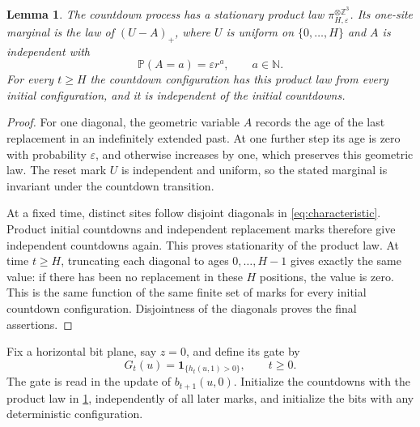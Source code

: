 \documentclass[11pt]{article}
\theoremstyle{plain}
\newtheorem{lemma}[theorem]{Lemma}
\theoremstyle{definition}
\theoremstyle{remark}
\newcommand{\Z}{\mathbb Z}
\newcommand{\N}{\mathbb N}
\newcommand{\Prob}{\mathbb P}
\newcommand{\eps}{\varepsilon}
\newcommand{\ind}{\mathbf 1}
\begin{document}
\begin{lemma}\label{lem:stationaryclock}
The countdown process has a stationary product law $\pi_{H,\eps}^{\otimes\Z^3}$. Its one-site marginal is the law of $(U-A)_+$, where $U$ is uniform on $\{0,\ldots,H\}$ and $A$ is independent with
\[
 \Prob(A=a)=\eps r^a,\qquad a\in\N.
\]
For every $t\geq H$ the countdown configuration has this product law from every initial configuration, and it is independent of the initial countdowns.
\end{lemma}
\begin{proof}
For one diagonal, the geometric variable $A$ records the age of the last replacement in an indefinitely extended past. At one further step its age is zero with probability $\eps$, and otherwise increases by one, which preserves this geometric law. The reset mark $U$ is independent and uniform, so the stated marginal is invariant under the countdown transition.

At a fixed time, distinct sites follow disjoint diagonals in \eqref{eq:characteristic}. Product initial countdowns and independent replacement marks therefore give independent countdowns again. This proves stationarity of the product law. At time $t\geq H$, truncating each diagonal to ages $0,\ldots,H-1$ gives exactly the same value: if there has been no replacement in these $H$ positions, the value is zero. This is the same function of the same finite set of marks for every initial countdown configuration. Disjointness of the diagonals proves the final assertions.
\end{proof}

Fix a horizontal bit plane, say $z=0$, and define its gate by
\[
 G_t(u)=\ind_{\{h_t(u,1)>0\}},\qquad t\geq0.
\]
The gate is read in the update of $b_{t+1}(u,0)$. Initialize the countdowns with the product law in \cref{lem:stationaryclock}, independently of all later marks, and initialize the bits with any deterministic configuration.
\end{document}
